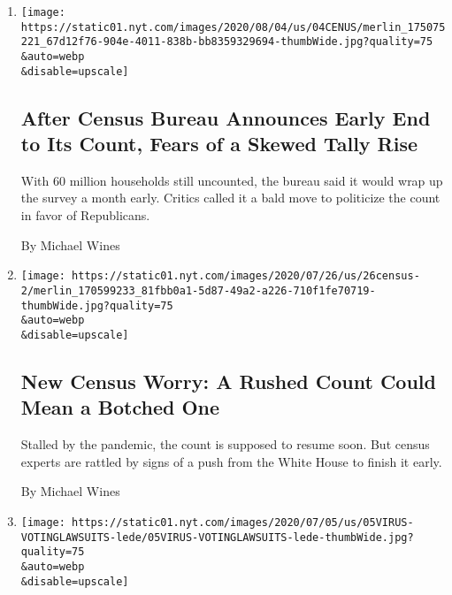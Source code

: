 \begin{enumerate}
\def\labelenumi{\arabic{enumi}.}
\item
  \href{/2020/08/04/us/2020-census-ending-early.html}{}

  \texttt{[image: https://static01.nyt.com/images/2020/08/04/us/04CENUS/merlin\_175075221\_67d12f76-904e-4011-838b-bb8359329694-thumbWide.jpg?quality=75\\\&auto=webp\\\&disable=upscale]}

  \hypertarget{after-census-bureau-announces-early-end-to-its-count-fears-of-a-skewed-tally-rise}{%
  \subsection{After Census Bureau Announces Early End to Its Count,
  Fears of a Skewed Tally
  Rise}\label{after-census-bureau-announces-early-end-to-its-count-fears-of-a-skewed-tally-rise}}

  With 60 million households still uncounted, the bureau said it would
  wrap up the survey a month early. Critics called it a bald move to
  politicize the count in favor of Republicans.

  By Michael Wines
\item
  \href{/2020/07/28/us/trump-census.html}{}

  \texttt{[image: https://static01.nyt.com/images/2020/07/26/us/26census-2/merlin\_170599233\_81fbb0a1-5d87-49a2-a226-710f1fe70719-thumbWide.jpg?quality=75\\\&auto=webp\\\&disable=upscale]}

  \hypertarget{new-census-worry-a-rushed-count-could-mean-a-botched-one}{%
  \subsection{New Census Worry: A Rushed Count Could Mean a Botched
  One}\label{new-census-worry-a-rushed-count-could-mean-a-botched-one}}

  Stalled by the pandemic, the count is supposed to resume soon. But
  census experts are rattled by signs of a push from the White House to
  finish it early.

  By Michael Wines
\item
  \href{/2020/07/07/us/2020-election-laws.html}{}

  \texttt{[image: https://static01.nyt.com/images/2020/07/05/us/05VIRUS-VOTINGLAWSUITS-lede/05VIRUS-VOTINGLAWSUITS-lede-thumbWide.jpg?quality=75\\\&auto=webp\\\&disable=upscale]}

  \hypertarget{as-november-looms-so-does-the-most-litigious-election-ever}{%
}
\end{enumerate}

